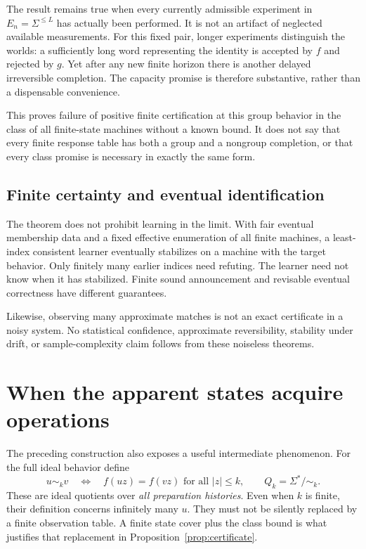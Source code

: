 \documentclass[11pt]{article}
\theoremstyle{remark}
\begin{document}
The result remains true when every currently admissible experiment in $E_n=\Sigma^{\le L}$ has actually been performed. It is not an artifact of neglected available measurements. For this fixed pair, longer experiments distinguish the worlds: a sufficiently long word representing the identity is accepted by $f$ and rejected by $g$. Yet after any new finite horizon there is another delayed irreversible completion. The capacity promise is therefore substantive, rather than a dispensable convenience.

This proves failure of positive finite certification at this group behavior in the class of all finite-state machines without a known bound. It does not say that every finite response table has both a group and a nongroup completion, or that every class promise is necessary in exactly the same form.

\subsection{Finite certainty and eventual identification}

The theorem does not prohibit learning in the limit. With fair eventual membership data and a fixed effective enumeration of all finite machines, a least-index consistent learner eventually stabilizes on a machine with the target behavior. Only finitely many earlier indices need refuting. The learner need not know when it has stabilized. Finite sound announcement and revisable eventual correctness have different guarantees.

Likewise, observing many approximate matches is not an exact certificate in a noisy system. No statistical confidence, approximate reversibility, stability under drift, or sample-complexity claim follows from these noiseless theorems.

\section{When the apparent states acquire operations}
\label{sec:descent}

The preceding construction also exposes a useful intermediate phenomenon. For the full ideal behavior define
\[
 u\sim_k v\quad\Longleftrightarrow\quad
 f(uz)=f(vz)\text{ for all }|z|\le k,
 \qquad Q_k=\Sigma^*/{\sim_k}.
\]
These are ideal quotients over \emph{all preparation histories}. Even when $k$ is finite, their definition concerns infinitely many $u$. They must not be silently replaced by a finite observation table. A finite state cover plus the class bound is what justifies that replacement in Proposition~\ref{prop:certificate}.
\end{document}
